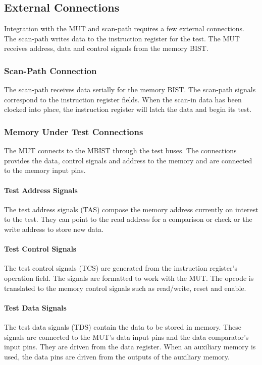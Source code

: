 \subsection{External Connections}
Integration with the MUT and scan-path requires a few external connections.  The scan-path writes data to the instruction register for the test.  The MUT receives address, data and control signals from the memory BIST.

\subsubsection{Scan-Path Connection}
The scan-path receives data serially for the memory BIST.  The scan-path signals correspond to the instruction register fields.  When the scan-in data has been clocked into place, the instruction register will latch the data and begin its test.  

\subsubsection{Memory Under Test Connections}
The MUT connects to the MBIST through the test buses.  The connections provides the data, control signals and address to the memory and are connected to the memory input pins.  

\paragraph{Test Address Signals}
The test address signals (TAS) compose the memory address currently on interest to the test.  They can point to the read address for a comparison or check or the write address to store new data.

\paragraph{Test Control Signals}
The test control signals (TCS) are generated from the instruction register's operation field.  The signals are formatted to work with the MUT.  The opcode is translated to the memory control signals such as read/write, reset and enable.  

\paragraph{Test Data Signals}
The test data signals (TDS) contain the data to be stored in memory.  These signals are connected to the MUT's data input pins and the data comparator's input pins.  They are driven from the data register.  When an auxiliary memory is used, the data pins are driven from the outputs of the auxiliary memory.

